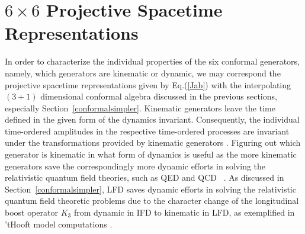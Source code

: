 \documentclass[journal,article,submit,pdftex,moreauthors]{Definitions/mdpi}
\begin{document}
\section{\texorpdfstring{$6\times6$}{TEXT} Projective Spacetime Representations}
\label{sec:projectivespace}
In order to characterize the individual properties of the six conformal generators, namely, which generators are kinematic or dynamic, we may correspond the projective spacetime representations 
given by Eq.(\ref{Jab}) with
the interpolating $(3+1)$ dimensional conformal algebra
discussed in the previous sections, especially Section~\ref{conformalsimpler}. 
Kinematic generators leave the time defined in the given form of the dynamics invariant.
Consequently, the individual time-ordered amplitudes in the respective time-ordered processes are invariant under the transformations provided by kinematic generators \cite{Ji2001}.
Figuring out which generator is kinematic in what form of dynamics is useful as the more kinematic generators save the correspondingly more dynamic efforts in solving the relativistic quantum field theories, such as QED and QCD~ \cite{ji2023relativistic}. As discussed in Section~\ref{conformalsimpler}, 
LFD saves dynamic efforts in solving the relativistic quantum field theoretic problems due to the character change of the longitudinal boost operator $K_3$ from dynamic in IFD to kinematic in LFD, as exemplified in 'tHooft model computations  \cite{THOOFT1974461, Ji2021QCD, ji2023relativistic}.
\end{document}
